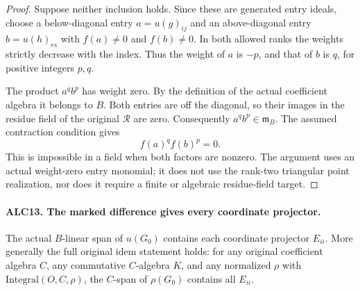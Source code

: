 \documentclass[11pt,a4paper]{article}
\numberwithin{equation}{section}
\theoremstyle{remark}\newtheorem{remark}[theorem]{Remark}
\begin{document}
\begin{proof}
Suppose neither inclusion holds.  Since these are generated
entry ideals, choose a below-diagonal entry \(a=u(g)_{ij}\)
and an above-diagonal entry \(b=u(h)_{rs}\) with
\(f(a)\ne0\) and \(f(b)\ne0\).  In both allowed ranks
the weights strictly decrease with the index.  Thus the
weight of \(a\) is \(-p\), and that of \(b\) is \(q\),
for positive integers \(p,q\).

The product \(a^qb^p\) has weight zero.  By the definition
of the actual coefficient algebra it belongs to \(B\).
Both entries are off the diagonal, so their images in the
residue field of the original \(\mathcal R\) are zero.
Consequently \(a^qb^p\in\mathfrak m_B\).  The assumed
contraction condition gives
\[
                       f(a)^q f(b)^p=0.
\]
This is impossible in a field when both factors are nonzero.
The argument uses an actual weight-zero entry monomial; it
does not use the rank-two triangular point realization, nor
does it require a finite or algebraic residue-field target.
\end{proof}

\paragraph{ALC13. The marked difference gives every coordinate projector.}
\label{claim:ALC13}
The actual \(B\)-linear span of \(u(G_0)\) contains each
coordinate projector \(E_{ii}\).  More generally the full
original \(\mathrm{idem}\) statement holds: for any original
coefficient algebra \(C\), any commutative \(C\)-algebra
\(K\), and any normalized \(\rho\) with
\(\mathrm{Integral}(O,C,\rho)\), the \(C\)-span of
\(\rho(G_0)\) contains all \(E_{ii}\).
\end{document}

